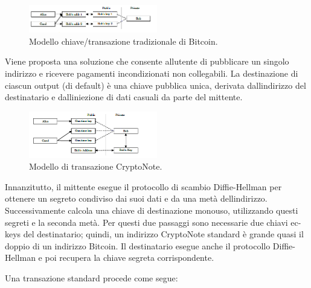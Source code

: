 \begin{figure}[h]
  \centering
  \includegraphics[width=0.5\textwidth]{image6.png}
  \caption{Modello chiave/transazione tradizionale di Bitcoin.}
  \label{fig:my_label}
\end{figure}

Viene proposta una soluzione che consente all\textquotesingle utente di
pubblicare un singolo indirizzo e ricevere pagamenti incondizionati non
collegabili. La destinazione di ciascun output (di default) è una chiave
pubblica unica, derivata dall\textquotesingle indirizzo del destinatario
e dall\textquotesingle iniezione di dati casuali da parte del
mittente.\\

\begin{figure}[h]
  \centering
  \includegraphics[width=0.5\textwidth]{image7.png}
  \caption{Modello di transazione CryptoNote.}
  \label{fig:my_label}
\end{figure}

Innanzitutto, il mittente esegue il protocollo di scambio Diffie-Hellman
per ottenere un segreto condiviso dai suoi dati e da una metà
dell\textquotesingle indirizzo. Successivamente calcola una chiave di
destinazione monouso, utilizzando questi segreti e la seconda metà. Per
questi due passaggi sono necessarie due chiavi ec-keys del destinatario;
quindi, un indirizzo CryptoNote standard è grande quasi il doppio di un
indirizzo Bitcoin. Il destinatario esegue anche il protocollo
Diffie-Hellman e poi recupera la chiave segreta corrispondente.

Una transazione standard procede come segue:


